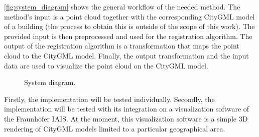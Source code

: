         \autoref{fig:system_diagram} shows the general workflow of the needed method.
        The method’s input is a point cloud together with the corresponding CityGML model of a building  
        (the process to obtain this is outside of the scope of this work).
        The provided input is then preprocessed and used for the registration algorithm.
        The output of the registration algorithm is a transformation that maps the point cloud to the CityGML model.
        Finally, the output transformation and the input data are used to visualize the point cloud on the CityGML model.

        \begin{figure}[H]
            \centering
            
            \caption{System diagram.}
            \label{fig:system_diagram}
        \end{figure}

        Firstly, the implementation will be tested individually. 
        Secondly, the implementation will be tested with its integration on a visualization software of the Fraunhofer IAIS. 
        At the moment, this visualization software is a simple 3D rendering of CityGML models limited to a particular geographical area.



